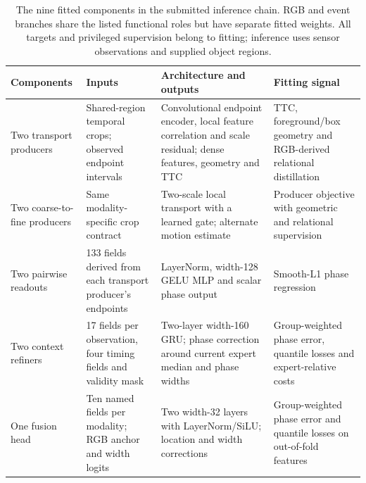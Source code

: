 \begin{table}[htbp]
\centering\scriptsize
\caption{The nine fitted components in the submitted inference chain. RGB and event branches share the listed functional roles but have separate fitted weights. All targets and privileged supervision belong to fitting; inference uses sensor observations and supplied object regions.}
\label{tab:component-contracts}
\begin{tabularx}{\linewidth}{@{}p{.15\linewidth}p{.23\linewidth}p{.26\linewidth}X@{}}
\toprule
Components & Inputs & Architecture and outputs & Fitting signal \\
\midrule
Two transport producers & Shared-region temporal crops; observed endpoint intervals & Convolutional endpoint encoder, local feature correlation and scale residual; dense features, geometry and TTC & TTC, foreground/box geometry and RGB-derived relational distillation \\
Two coarse-to-fine producers & Same modality-specific crop contract & Two-scale local transport with a learned gate; alternate motion estimate & Producer objective with geometric and relational supervision \\
Two pairwise readouts & 133 fields derived from each transport producer's endpoints & LayerNorm, width-128 GELU MLP and scalar phase output & Smooth-L1 phase regression \\
Two context refiners & 17 fields per observation, four timing fields and validity mask & Two-layer width-160 GRU; phase correction around current expert median and phase widths & Group-weighted phase error, quantile losses and expert-relative costs \\
One fusion head & Ten named fields per modality; RGB anchor and width logits & Two width-32 layers with LayerNorm/SiLU; location and width corrections & Group-weighted phase error and quantile losses on out-of-fold features \\
\bottomrule
\end{tabularx}
\end{table}
